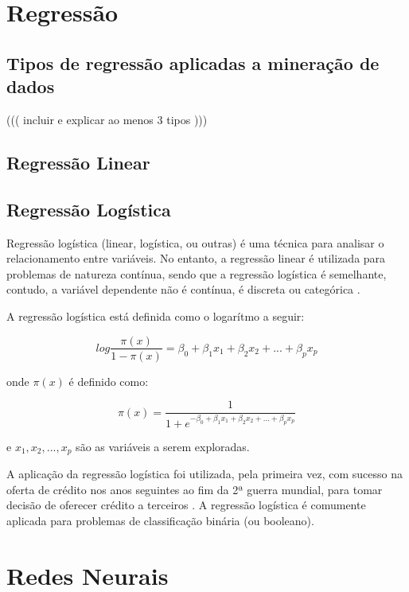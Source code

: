 \section{Regressão}

\subsection{Tipos de regressão aplicadas a mineração de dados}

((( incluir e explicar ao menos 3 tipos )))

\subsection{Regressão Linear}

\subsection{Regressão Logística}
Regressão logística (linear, logística, ou outras) é uma técnica para analisar o relacionamento entre variáveis. No entanto, a regressão linear é utilizada para problemas de natureza
contínua, sendo que a regressão logística é semelhante, contudo, a variável dependente não é contínua, é discreta ou categórica \cite{DecisaoCredito}.

A regressão logística está definida como o logarítmo a seguir:

\begin{equation}
 log{\frac{\pi(x)}{1-\pi(x)}} = \beta_0 + \beta_1 x_1 + \beta_2 x_2 + ... + \beta_p x_p
\end{equation}

onde $\pi(x)$ é definido como:

\begin{equation}
 \pi(x) = \dfrac{1}{1 + e^{-{\beta_0 + \beta_1 x_1 + \beta_2 x_2 + ... + \beta_p x_p}}}
\end{equation}

e $x_1, x_2,..., x_p$ são as variáveis a serem exploradas.


A aplicação da regressão logística foi utilizada, pela primeira vez, com sucesso na oferta de crédito nos anos seguintes ao fim da 2ª guerra mundial, para tomar decisão 
de oferecer crédito a terceiros \cite{RegrecaoLog}.
A regressão logística é comumente aplicada para problemas de classificação binária (ou booleano).

\pagebreak

\section{Redes Neurais}

